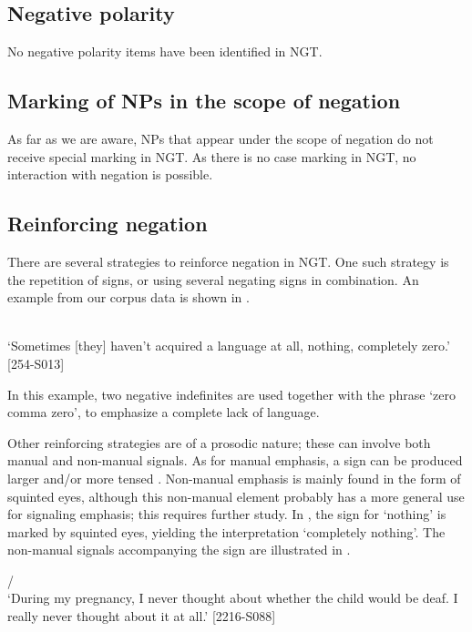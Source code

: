 \documentclass[output=paper,colorlinks,citecolor=brown]{langscibook}
\begin{document}
\subsection{Negative polarity} 
No negative polarity items have been identified in NGT.

\subsection{Marking of NPs in the scope of negation} 
As far as we are aware, NPs that appear under the scope of negation do not receive special marking in NGT. As there is no case marking in NGT, no interaction with negation is possible.

\subsection{Reinforcing negation}\label{sec:ngt:reinf}
There are several strategies to reinforce negation in NGT. One such strategy is the repetition of signs, or using several negating signs in combination. An example from our corpus data is shown in .

\ea\label{ex:ngt:reinf-1} 
     \\ `Sometimes [they] haven't acquired a language at all, nothing, completely zero.'  [254-S013]
\z

In this example, two negative indefinites are used together with the phrase `zero comma zero', to emphasize a complete lack of language. 

Other reinforcing strategies are of a prosodic nature; these can involve both manual and non-manual signals. As for manual emphasis, a sign can be produced larger and/or more tensed \citep{Klomp2021}. Non-manual emphasis is mainly found in the form of squinted eyes, although this non-manual element probably has a more general use for signaling emphasis; this requires further study. In , the sign for `nothing' is marked by squinted eyes, yielding the interpretation `completely nothing'. The non-manual signals accompanying the sign are illustrated in .

\ea\label{ex:ngt:reinf-2}
     /    \\ `During my pregnancy, I never thought about whether the child would be deaf. I really never thought about it at all.'  [2216-S088]
\z
\end{document}
